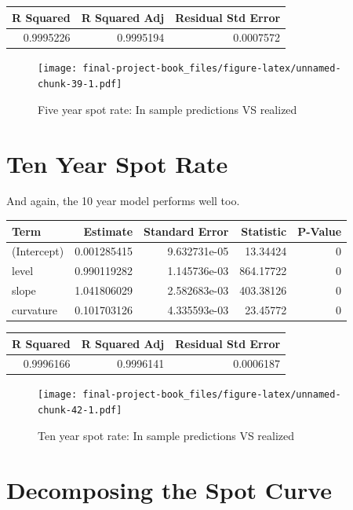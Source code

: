 \documentclass[]{book}
\theoremstyle{definition}
\theoremstyle{definition}
\theoremstyle{definition}
\theoremstyle{remark}
\begin{document}
\begin{tabular}{r|r|r}
\hline
R Squared & R Squared Adj & Residual Std Error\\
\hline
0.9995226 & 0.9995194 & 0.0007572\\
\hline
\end{tabular}

\begin{figure}
\centering
\texttt{[image: final-project-book\_files/figure-latex/unnamed-chunk-39-1.pdf]}
\caption{\label{fig:unnamed-chunk-39}Five year spot rate: In sample
predictions VS realized}
\end{figure}

\hypertarget{ten-year-spot-rate}{%
\section{Ten Year Spot Rate}\label{ten-year-spot-rate}}

And again, the 10 year model performs well too.

\begin{tabular}{l|r|r|r|r}
\hline
Term & Estimate & Standard Error & Statistic & P-Value\\
\hline
(Intercept) & 0.001285415 & 9.632731e-05 & 13.34424 & 0\\
\hline
level & 0.990119282 & 1.145736e-03 & 864.17722 & 0\\
\hline
slope & 1.041806029 & 2.582683e-03 & 403.38126 & 0\\
\hline
curvature & 0.101703126 & 4.335593e-03 & 23.45772 & 0\\
\hline
\end{tabular}

\begin{tabular}{r|r|r}
\hline
R Squared & R Squared Adj & Residual Std Error\\
\hline
0.9996166 & 0.9996141 & 0.0006187\\
\hline
\end{tabular}

\begin{figure}
\centering
\texttt{[image: final-project-book\_files/figure-latex/unnamed-chunk-42-1.pdf]}
\caption{\label{fig:unnamed-chunk-42}Ten year spot rate: In sample
predictions VS realized}
\end{figure}

\hypertarget{decomposing-the-spot-curve}{%
\section{Decomposing the Spot Curve}\label{decomposing-the-spot-curve}}
\end{document}
